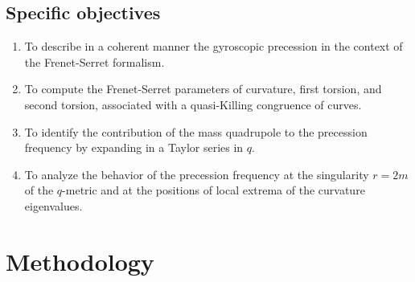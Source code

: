 \documentclass[12pt]{article}
\begin{document}
\subsection{Specific objectives}

\begin{enumerate}
	\item To describe in a coherent manner the gyroscopic precession in the context of the Frenet-Serret formalism.
	\item To compute the Frenet-Serret parameters of curvature, first torsion, and second torsion, associated with a quasi-Killing congruence of curves.
	\item To identify the contribution of the mass quadrupole to the precession frequency by expanding in a Taylor series in $q$.
	\item To analyze the behavior of the precession frequency at the singularity $r=2m$ of the $q$-metric and at the positions of local extrema of the curvature eigenvalues. 
\end{enumerate}

\section{Methodology}
\end{document}
